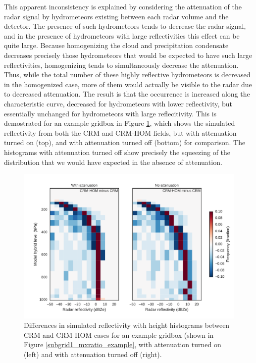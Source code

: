 This apparent inconsistency is explained by considering the attenuation of the radar signal by hydrometeors existing between each radar volume and the detector. The presence of such hydrometeors tends to decrease the radar signal, and in the presence of hydrometeors with large reflectivities this effect can be quite large. Because homogenizing the cloud and precipitation condensate decreases precisely those hydrometeors that would be expected to have such large reflectivities, homogenizing tends to simultaneously decrease the attenuation. Thus, while the total number of these highly reflective hydrometeors is decreased in the homogenized case, more of them would actually be visible to the radar due to decreased attenuation. The result is that the occurrence is increased along the characteristic curve, decreased for hydrometeors with lower reflectivity, but essentially unchanged for hydrometeors with large reflecitivity. This is demostrated for an example gridbox in Figure \ref{sg_cfadDbze94_testatt}, which shows the simulated reflectivity from both the CRM and CRM-HOM fields, but with attenuation turned on (top), and with attenuation turned off (bottom) for comparison. The histograms with attenuation turned off show precisely the squeezing of the distribution that we would have expected in the absence of attenuation.

\begin{figure}
\centering
\includegraphics[width=\columnwidth]{graphics/subgrid1_cfadDbze94_att-test.pdf}
\caption{Differences in simulated reflectivity with height histograms between CRM and CRM-HOM cases for an example gridbox (shown in Figure \ref{subgrid1_mxratio_example}, with attenuation turned on (left) and with attenuation turned off (right).}
\label{sg_cfadDbze94_testatt}
\end{figure}

